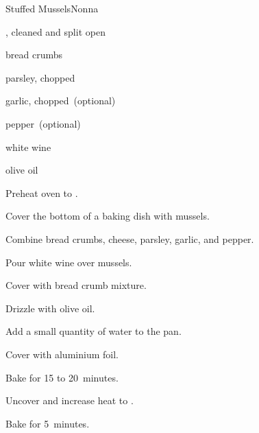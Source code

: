 \begin{recipe}{Stuffed Mussels}{Nonna}{}

\begin{ingredients}
\item {}, cleaned and split open
\item bread crumbs
\item {}
\item parsley, chopped
\item garlic, chopped~(optional)
\item pepper~(optional)
\item white wine
\item olive oil
\end{ingredients}

\begin{directions}
\item Preheat oven to .
\item Cover the bottom of a baking dish with mussels.
\item Combine bread crumbs, cheese, parsley, garlic, and pepper.
\item Pour white wine over mussels.
\item Cover with bread crumb mixture.
\item Drizzle with olive oil.
\item Add a small quantity of water to the pan.
\item Cover with aluminium foil.
\item Bake for 15 to 20~minutes.
\item Uncover and increase heat to .
\item Bake for 5~minutes.
\end{directions}

\end{recipe}

